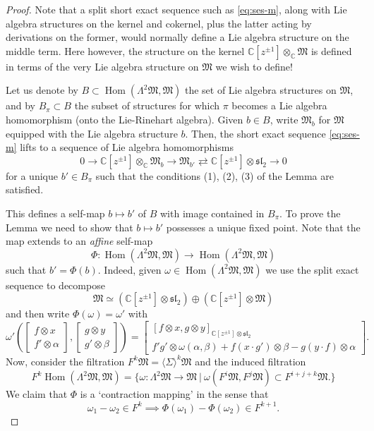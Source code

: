 \documentclass{article}
\def\fsl{\mathfrak{sl}}
\def\fM{\mathfrak{M}}
\def\CC{\mathbb{C}}
\DeclareMathOperator{\Hom}{\mathrm{Hom}}
\theoremstyle{definition}
\begin{document}
\begin{proof}
        Note that a split short exact sequence such as \eqref{eq:ses-m},
        along with Lie algebra structures on the kernel and cokernel,
        plus the latter acting by derivations on the former,
        would normally define a Lie algebra structure on the middle term.
        Here however, the structure on the kernel $\CC[z^{\pm1}]\otimes_\CC\fM$
        is defined in terms of the very Lie algebra structure on $\fM$ we wish
        to define!

        Let us denote by $B \subset \Hom(\Lambda^2\fM,\fM)$ the set 
        of Lie algebra structures on $\fM$, and
        by $B_\pi\subset B$ the subset of structures for which $\pi$ becomes
        a Lie algebra homomorphism (onto the Lie-Rinehart algebra).
        Given $b \in B$, write $\fM_b$ for $\fM$ equipped with the Lie algebra
        structure $b$. Then, the short exact sequence \eqref{eq:ses-m} lifts
        to a sequence of Lie algebra homomorphisms
        $$ 0 \to \CC[z^{\pm1}]\otimes_\CC \fM_b \to \fM_{b'} \rightleftarrows \CC[z^{\pm1}]\otimes\fsl_2\to 0$$
        for a unique $b' \in B_\pi$ such that
        the conditions (1), (2), (3) of the Lemma are satisfied.

        This defines a self-map $b\mapsto b'$ of $B$ with image
        contained in $B_\pi$. To prove the Lemma 
        we need to show that $b\mapsto b'$ possesses a unique fixed point.
        Note that the map extends to an \emph{affine} self-map 
        $$\Phi : \Hom(\Lambda^2\fM,\fM) \to \Hom(\Lambda^2\fM,\fM)$$ such that $b'=\Phi(b)$.
        Indeed, given $\omega \in \Hom(\Lambda^2\fM,\fM)$ we use
        the split exact sequence to decompose
        $$ \fM \simeq \left(\CC[z^{\pm1}]\otimes\fsl_2\right) \oplus \left(\CC[z^{\pm1}]\otimes\fM\right) $$ 
        and then write $\Phi(\omega)=\omega'$ with
$$ 
\omega'\left(
\left[\begin{matrix}f\otimes x \\ f'\otimes\alpha\end{matrix}\right], \left[\begin{matrix}g\otimes y \\ g'\otimes\beta\end{matrix}\right]\right) 
= 
\left[\begin{matrix}
[f\otimes x,g\otimes y]_{\CC[z^{\pm1}]\otimes\fsl_2} 
\\
f'g'\otimes\omega(\alpha,\beta) 
+ f(x\cdot g')\otimes\beta - g(y\cdot f)\otimes\alpha
\end{matrix}\right].$$
Now, consider the filtration $F^k\fM = \langle \Sigma\rangle^k \fM$
and
the induced filtration 
$$ F^k \Hom(\Lambda^2\fM,\fM) = \{ \omega : \Lambda^2\fM\to\fM\ |\ 
        \omega(F^i\fM, F^j\fM) \subset F^{i+j+k}\fM.
\} $$
We claim that $\Phi$ is a `contraction mapping' in the sense that
$$
 \omega_1 - \omega_2 \in F^k \implies \Phi(\omega_1)-\Phi(\omega_2) \in F^{k+1}.
$$
\end{proof}
\end{document}
